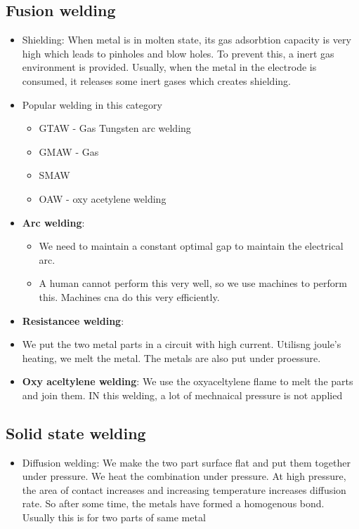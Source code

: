 \documentclass{article}
\begin{document}
	\subsection{Fusion welding}
		\begin{itemize}
			\item Shielding: When metal is in molten state, its gas adsorbtion capacity is very high which leads to pinholes and blow holes. To prevent this, a inert gas environment is provided. Usually, when the metal in the electrode is consumed, it releases some inert gases which creates shielding.
			\item Popular welding in this category
				\begin{itemize}
					\item GTAW - Gas Tungsten arc welding
					\item GMAW - Gas 
					\item SMAW
					\item OAW - oxy acetylene welding
				\end{itemize}

		\item \textbf{Arc welding}:
			\begin{itemize}
				\item We need to maintain a constant optimal gap to maintain the electrical arc.
				\item A human cannot perform this very well, so we use machines to perform this. Machines cna do this very efficiently.
			\end{itemize}

		\item \textbf{Resistancee welding}:
			\item We put the two metal parts in a circuit with high current. Utilisng joule's heating, we melt the metal. The metals are also put under proessure.

		\item \textbf{Oxy aceltylene welding}: We use the oxyaceltylene flame to melt the parts and join them. IN this welding, a lot of mechnaical pressure is not applied
		\end{itemize}

	\subsection{Solid state welding}
		\begin{itemize}
			\item Diffusion welding: We make the two part surface flat and put them together under pressure. We heat the combination under pressure. At high pressure, the area of contact increases and increasing temperature increases diffusion rate. So after some time, the metals have formed a homogenous bond. Usually this is for two parts of same metal
		\end{itemize}
\end{document}

